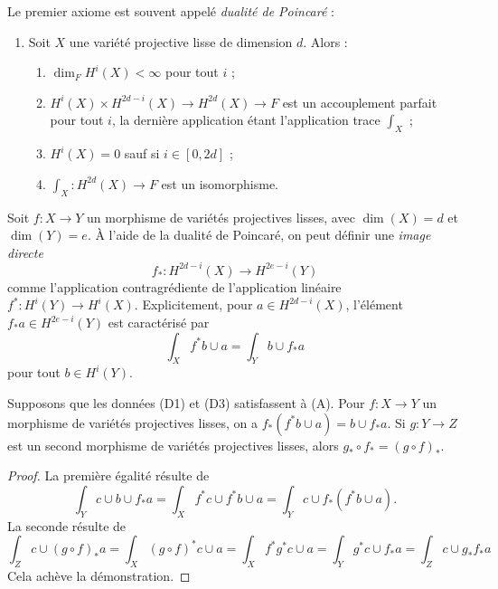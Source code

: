 \medskip\noindent
Le premier axiome est souvent appelé {\it dualité de Poincar\'e} :
\begin{enumerate}
\item[(A)] Soit $X$ une variété projective lisse de dimension $d$. Alors :
\begin{enumerate}
\item $\dim_F H^i(X) < \infty$ pour tout $i$ ;
\item $H^i(X) \times H^{2d - i}(X) \rightarrow H^{2d}(X) \rightarrow F$
est un accouplement parfait pour tout $i$, la dernière
application étant l'application trace $\int_X$ ;
\item $H^i(X) = 0$ sauf si $i \in [0, 2d]$ ;
\item $\int_X : H^{2d}(X) \to F$ est un isomorphisme.
\end{enumerate}
\end{enumerate}
Soit $f : X \to Y$ un morphisme de variétés projectives lisses,
avec $\dim(X) = d$ et $\dim(Y) = e$. À l'aide de la dualité de Poincar\'e,
on peut définir une {\it image directe}
$$
f_* : H^{2d - i}(X) \longrightarrow H^{2e - i}(Y)
$$
comme l'application contragrédiente de l'application linéaire $f^* : H^i(Y) \to H^i(X)$.
Explicitement, pour $a \in H^{2d - i}(X)$, l'élément $f_*a \in H^{2e - i}(Y)$
est caractérisé par
$$
\int_X f^*b \cup a = \int_Y b \cup f_*a
$$
pour tout $b \in H^i(Y)$.

\begin{lemma}
\label{lemma-pushforward-classical}
Supposons que les données (D1) et (D3) satisfassent à (A). Pour $f : X \to Y$
un morphisme de variétés projectives lisses, on a
$f_*(f^*b \cup a) = b \cup f_*a$. Si $g : Y \to Z$ est un second morphisme
de variétés projectives lisses, alors $g_* \circ f_* = (g \circ f)_*$.
\end{lemma}

\begin{proof}
La première égalité résulte de
$$
\int_Y c \cup b \cup f_*a =
\int_X f^*c \cup f^*b \cup a =
\int_Y c \cup f_*(f^*b \cup a).
$$
La seconde résulte de
$$
\int_Z c \cup (g \circ f)_*a = \int_X (g \circ f)^*c \cup a =
\int_X f^* g^* c \cup a = \int_Y g^*c \cup f_*a = \int_Z c \cup g_*f_*a
$$
Cela achève la démonstration.
\end{proof}

